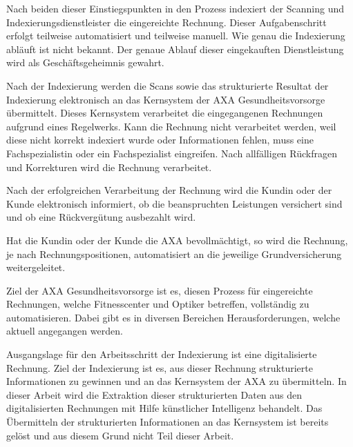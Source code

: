 Nach beiden dieser Einstiegspunkten in den Prozess indexiert der Scanning und Indexierungsdienstleister die eingereichte Rechnung. Dieser Aufgabenschritt erfolgt teilweise automatisiert und teilweise manuell. Wie genau die Indexierung abläuft ist nicht bekannt. Der genaue Ablauf dieser eingekauften Dienstleistung wird als Geschäftsgeheimnis gewahrt.

Nach der Indexierung werden die Scans sowie das strukturierte Resultat der Indexierung elektronisch an das Kernsystem der AXA Gesundheitsvorsorge übermittelt. Dieses Kern\-system verarbeitet die eingegangenen Rechnungen aufgrund eines Regelwerks. Kann die Rechnung nicht verarbeitet werden, weil diese nicht korrekt indexiert wurde oder Informationen fehlen, muss eine Fachspezialistin oder ein Fachspezialist eingreifen. Nach allfälligen Rückfragen und Korrekturen wird die Rechnung verarbeitet. 

Nach der erfolgreichen Verarbeitung der Rechnung wird die Kundin oder der Kunde elektronisch informiert, ob die beanspruchten Leistungen versichert sind und ob eine Rückvergütung ausbezahlt wird.

Hat die Kundin oder der Kunde die AXA bevollmächtigt, so wird die Rechnung, je nach Rechnungspositionen, automatisiert an die jeweilige Grundversicherung weitergeleitet.

Ziel der AXA Gesundheitsvorsorge ist es, diesen Prozess für eingereichte Rechnungen, welche Fitnesscenter und Optiker betreffen, vollständig zu automatisieren. Dabei gibt es in diversen Bereichen Herausforderungen, welche aktuell angegangen werden.

Ausgangslage für den Arbeitsschritt der Indexierung ist eine digitalisierte Rechnung. Ziel der Indexierung ist es, aus dieser Rechnung strukturierte Informationen zu gewinnen und an das Kernsystem der AXA zu übermitteln. In dieser Arbeit wird die Extraktion dieser strukturierten Daten aus den digitalisierten Rechnungen mit Hilfe künstlicher Intelligenz behandelt. Das Übermitteln der strukturierten Informationen an das Kernsystem ist bereits gelöst und aus diesem Grund nicht Teil dieser Arbeit.




